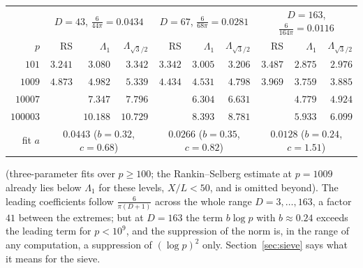 \documentclass[11pt]{amsart}
\theoremstyle{remark}
\begin{document}
\begin{center}\footnotesize\setlength{\tabcolsep}{4pt}
\begin{tabular}{r|rrr|rrr|rrr}
\toprule
 & \multicolumn{3}{c|}{$D=43$, $\frac6{44\pi}=0.0434$} & \multicolumn{3}{c|}{$D=67$, $\frac6{68\pi}=0.0281$} & \multicolumn{3}{c}{$D=163$, $\frac6{164\pi}=0.0116$}\\
$p$ & RS & $\Lambda_1$ & $\Lambda_{\sqrt3/2}$ & RS & $\Lambda_1$ & $\Lambda_{\sqrt3/2}$ & RS & $\Lambda_1$ & $\Lambda_{\sqrt3/2}$\\
\midrule
$101$ & $3.241$ & $3.080$ & $3.342$ & $3.342$ & $3.005$ & $3.206$ & $3.487$ & $2.875$ & $2.976$\\
$1009$ & $4.873$ & $4.982$ & $5.339$ & $4.434$ & $4.531$ & $4.798$ & $3.969$ & $3.759$ & $3.885$\\
$10007$ & & $7.347$ & $7.796$ & & $6.304$ & $6.631$ & & $4.779$ & $4.924$\\
$100003$ & & $10.188$ & $10.729$ & & $8.393$ & $8.781$ & & $5.933$ & $6.099$\\
\midrule
fit $a$ & \multicolumn{3}{c|}{$0.0443$ ($b=0.32$, $c=0.68$)} & \multicolumn{3}{c|}{$0.0266$ ($b=0.35$, $c=0.82$)} & \multicolumn{3}{c}{$0.0128$ ($b=0.24$, $c=1.51$)}\\
\bottomrule
\end{tabular}
\end{center}
(three-parameter fits over $p\ge100$; the Rankin--Selberg estimate at $p=1009$ already lies below $\Lambda_1$ for these levels, $X/L<50$, and is omitted beyond). The leading coefficients follow $\frac6{\pi(D+1)}$ across the whole range $D=3,\dots,163$, a factor $41$ between the extremes; but at $D=163$ the term $b\log p$ with $b\approx0.24$ exceeds the leading term for $p<10^9$, and the suppression of the norm is, in the range of any computation, a suppression of $(\log p)^2$ only. Section~\ref{sec:sieve} says what it means for the sieve.
\end{document}
